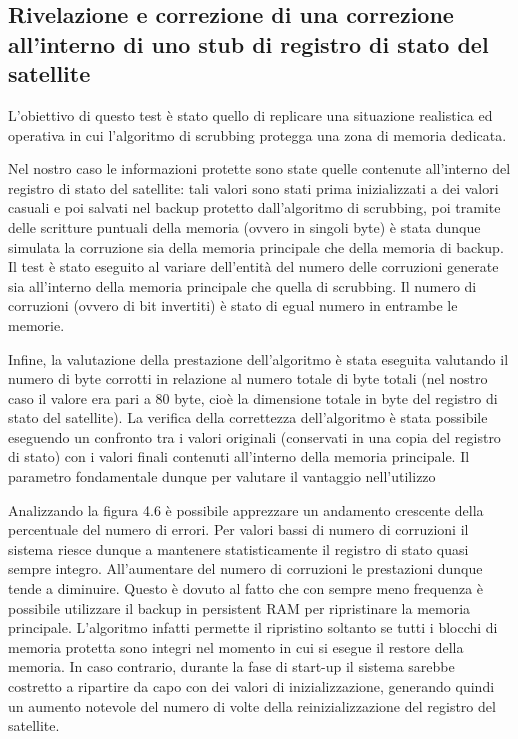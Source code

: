 \documentclass[LaM,binding=0.6cm,oneside]{../sapthesis}
\begin{document}
\subsection{Rivelazione e correzione di una correzione all'interno di uno stub di registro di stato del satellite}

L'obiettivo di questo test è stato quello di replicare una situazione realistica ed operativa in cui l'algoritmo di scrubbing protegga una zona di memoria dedicata. 

Nel nostro caso le informazioni protette sono state quelle contenute all'interno del registro di stato del satellite: tali valori sono stati prima inizializzati a dei valori casuali e poi salvati nel backup protetto dall'algoritmo di scrubbing, poi tramite delle scritture puntuali della memoria (ovvero in singoli byte) è stata dunque simulata la corruzione sia della memoria principale che della memoria di backup. \newline\newline
Il test è stato eseguito al variare dell'entità del numero delle corruzioni generate sia all'interno della memoria principale che quella di scrubbing. Il numero di corruzioni (ovvero di bit invertiti) è stato di egual numero in entrambe le memorie.

Infine, la valutazione della prestazione dell'algoritmo è stata eseguita valutando il numero di byte corrotti in relazione al numero totale di byte totali (nel nostro caso il valore era pari a 80 byte, cioè la dimensione totale in byte del registro di stato del satellite). 
La verifica della correttezza dell'algoritmo è stata possibile eseguendo un confronto tra i valori originali (conservati in una copia del registro di stato) con i valori finali contenuti all'interno della memoria principale. Il parametro fondamentale dunque per valutare il vantaggio nell'utilizzo 

\newpage

Analizzando la figura 4.6 è possibile apprezzare un andamento crescente della percentuale del numero di errori. Per valori bassi di numero di corruzioni il sistema riesce dunque a mantenere statisticamente il registro di stato quasi sempre integro. All'aumentare del numero di corruzioni le prestazioni dunque tende a diminuire. Questo è dovuto al fatto che con sempre meno frequenza è possibile utilizzare il backup in persistent RAM per ripristinare la memoria principale. L'algoritmo infatti permette il ripristino soltanto se tutti i blocchi di memoria protetta sono integri nel momento in cui si esegue il restore della memoria. In caso contrario, durante la fase di start-up il sistema sarebbe costretto a ripartire da capo con dei valori di inizializzazione, generando quindi un aumento notevole del numero di volte della reinizializzazione del registro del satellite. 
\end{document}
